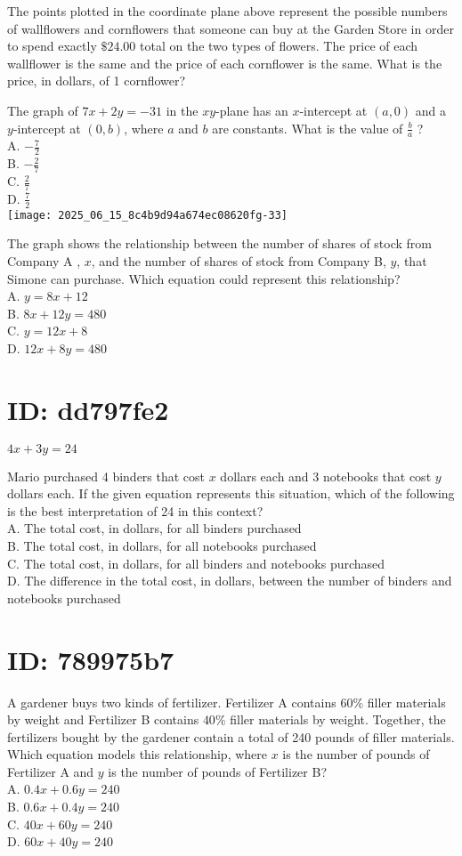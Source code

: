 The points plotted in the coordinate plane above represent the possible numbers of wallflowers and cornflowers that someone can buy at the Garden Store in order to spend exactly $\$ 24.00$ total on the two types of flowers. The price of each wallflower is the same and the price of each cornflower is the same. What is the price, in dollars, of 1 cornflower?

The graph of $7 x+2 y=-31$ in the $x y$-plane has an $x$-intercept at $(a, 0)$ and a $y$-intercept at $(0, b)$, where $a$ and $b$ are constants. What is the value of $\frac{b}{a}$ ?\\
A. $-\frac{7}{2}$\\
B. $-\frac{2}{7}$\\
C. $\frac{2}{7}$\\
D. $\frac{7}{2}$\\
\texttt{[image: 2025\_06\_15\_8c4b9d94a674ec08620fg-33]}

The graph shows the relationship between the number of shares of stock from Company A , $x$, and the number of shares of stock from Company B, $y$, that Simone can purchase. Which equation could represent this relationship?\\
A. $y=8 x+12$\\
B. $8 x+12 y=480$\\
C. $y=12 x+8$\\
D. $12 x+8 y=480$

\section*{ID: dd797fe2}
$4 x+3 y=24$

Mario purchased 4 binders that cost $x$ dollars each and 3 notebooks that cost $y$ dollars each. If the given equation represents this situation, which of the following is the best interpretation of 24 in this context?\\
A. The total cost, in dollars, for all binders purchased\\
B. The total cost, in dollars, for all notebooks purchased\\
C. The total cost, in dollars, for all binders and notebooks purchased\\
D. The difference in the total cost, in dollars, between the number of binders and notebooks purchased

\section*{ID: 789975b7}
A gardener buys two kinds of fertilizer. Fertilizer A contains $60 \%$ filler materials by weight and Fertilizer B contains $40 \%$ filler materials by weight. Together, the fertilizers bought by the gardener contain a total of 240 pounds of filler materials. Which equation models this relationship, where $x$ is the number of pounds of Fertilizer A and $y$ is the number of pounds of Fertilizer B?\\
A. $0.4 x+0.6 y=240$\\
B. $0.6 x+0.4 y=240$\\
C. $40 x+60 y=240$\\
D. $60 x+40 y=240$

